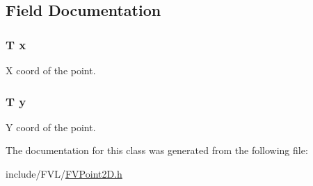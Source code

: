 \subsection{Field Documentation}
\hypertarget{classFVL_1_1FVPoint2D_a9a4f74af87a76a4c3dcb729cb0e68f8d}{
\subsubsection[{x}]{\setlength{\rightskip}{0pt plus 5cm}T {\bf x}}}
\label{d8/d2b/classFVL_1_1FVPoint2D_a9a4f74af87a76a4c3dcb729cb0e68f8d}


X coord of the point. 

\hypertarget{classFVL_1_1FVPoint2D_a1cb2b5ea04251d543e49356ef54eb853}{
\subsubsection[{y}]{\setlength{\rightskip}{0pt plus 5cm}T {\bf y}}}
\label{d8/d2b/classFVL_1_1FVPoint2D_a1cb2b5ea04251d543e49356ef54eb853}


Y coord of the point. 



The documentation for this class was generated from the following file:\begin{DoxyCompactItemize}
\item 
include/FVL/\hyperlink{FVL_2FVPoint2D_8h}{FVPoint2D.h}\end{DoxyCompactItemize}
